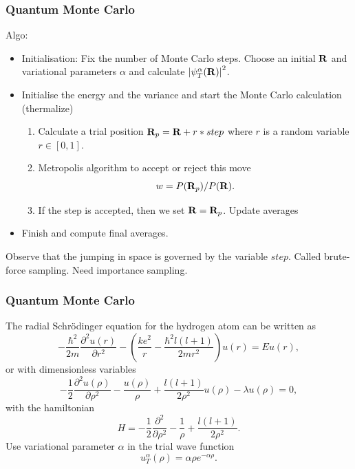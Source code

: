 \documentclass[compress]{beamer}
\begin{document}
\frame
{
  \frametitle{Quantum Monte Carlo}
\begin{small}
{\scriptsize
Algo:
       \begin{itemize}
          \item Initialisation: Fix the number of Monte Carlo steps. Choose an initial ${\bf R}$ and
                variational parameters $\alpha$ and 
                calculate
                $\left|\psi_T^{\alpha}({\bf R})\right|^2$. 
          \item Initialise the energy and the variance and start the Monte Carlo calculation (thermalize)
                \begin{enumerate}
                  \item Calculate  a trial position  ${\bf R}_p={\bf R}+r*step$
                        where $r$ is a random variable $r \in [0,1]$.
                  \item Metropolis algorithm to accept
                        or reject this move                         \[
                           w = P({\bf R}_p)/P({\bf R}).
                        \]
                  \item If the step is accepted, then we set 
                        ${\bf R}={\bf R}_p$. Update averages
                 \end{enumerate}
          \item Finish and
compute final averages.
      \end{itemize}
Observe that the jumping in space is governed by the variable $step$. Called brute-force sampling.
Need importance sampling.
}
\end{small}
}

\frame
{
  \frametitle{Quantum Monte Carlo}
\begin{small}
{\scriptsize
The radial Schr\"odinger equation for the hydrogen atom can be
written as
\[
-\frac{\hbar^2}{2m}\frac{\partial^2 u(r)}{\partial r^2}-
\left(\frac{ke^2}{r}-\frac{\hbar^2l(l+1)}{2mr^2}\right)u(r)=Eu(r),
\]
or with dimensionless variables
\[
-\frac{1}{2}\frac{\partial^2 u(\rho)}{\partial \rho^2}-
\frac{u(\rho)}{\rho}+\frac{l(l+1)}{2\rho^2}u(\rho)-\lambda u(\rho)=0,
\label{eq:hydrodimless1}
\]
with the hamiltonian
\[
H=-\frac{1}{2}\frac{\partial^2 }{\partial \rho^2}-
\frac{1}{\rho}+\frac{l(l+1)}{2\rho^2}.
\]
Use variational parameter $\alpha$ in the trial
wave function 
\[
   u_T^{\alpha}(\rho)=\alpha\rho e^{-\alpha\rho}. 
   \label{eq:trialhydrogen}
\]

}
\end{small}
}
\end{document}
